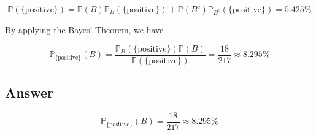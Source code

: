 \documentclass[12pt]{article}
\newcommand{\bP}{\mathbb{P}}
\begin{document}
\begin{enumerate}[label={},leftmargin=0in]
			\[\bP(\{\mathrm{positive}\}) = \bP(B)\bP_B(\{\mathrm{positive}\}) + \bP(B^c)\bP_{B^c}(\{\mathrm{positive}\}) = 5.425\%\]
			
			By applying the Bayes’ Theorem, we have
			
			\[
			\bP_{\{\mathrm{positive}\}}(B) = \frac{\bP_B(\{\mathrm{positive}\})\bP(B)}{\bP(\{\mathrm{positive}\})} = \frac{18}{217} \approx 8.295\%
			\]
		
		\subsection*{Answer}
		
			\[\boxed{\bP_{\{\mathrm{positive}\}}(B) = \frac{18}{217} \approx 8.295\%}\]

	\end{enumerate}
	
\end{document}
